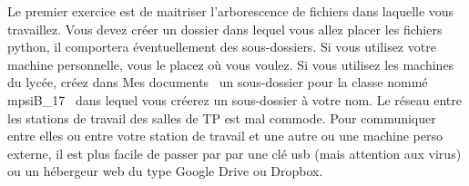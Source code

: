 Le premier exercice est de maitriser l'arborescence de fichiers dans laquelle vous travaillez. Vous devez créer un dossier dans lequel vous allez placer les fichiers python, il comportera éventuellement des sous-dossiers. \newline
Si vous utilisez votre machine personnelle, vous le placez où vous voulez. Si vous utilisez les machines du lycée, créez dans \og Mes documents\fg~ un sous-dossier pour la classe nommé \og mpsiB\_17\fg~ dans lequel vous créerez un sous-dossier à votre nom.\newline
Le réseau entre les stations de travail des salles de TP est mal commode. Pour communiquer entre elles ou entre votre station de travail et une autre ou une machine perso externe, il est plus facile de passer par par une clé usb (mais attention aux virus) ou un hébergeur web du type Google Drive ou Dropbox.